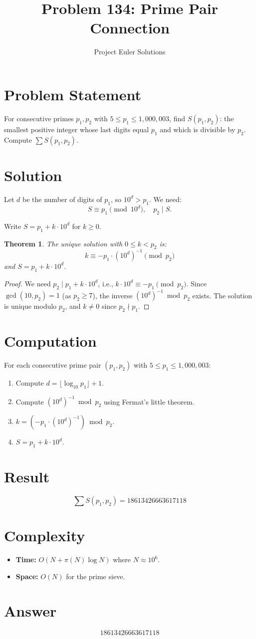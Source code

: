 \documentclass[12pt]{article}
\title{Problem 134: Prime Pair Connection}
\author{Project Euler Solutions}
\date{}
\newtheorem{theorem}{Theorem}
\begin{document}
\maketitle

\section{Problem Statement}
For consecutive primes $p_1, p_2$ with $5 \leq p_1 \leq 1{,}000{,}003$, find $S(p_1, p_2)$: the smallest positive integer whose last digits equal $p_1$ and which is divisible by $p_2$. Compute $\sum S(p_1, p_2)$.

\section{Solution}

Let $d$ be the number of digits of $p_1$, so $10^d > p_1$. We need:
\[
S \equiv p_1 \pmod{10^d}, \quad p_2 \mid S.
\]

Write $S = p_1 + k \cdot 10^d$ for $k \geq 0$.

\begin{theorem}
The unique solution with $0 \leq k < p_2$ is:
\[
k \equiv -p_1 \cdot (10^d)^{-1} \pmod{p_2}
\]
and $S = p_1 + k \cdot 10^d$.
\end{theorem}

\begin{proof}
We need $p_2 \mid p_1 + k \cdot 10^d$, i.e., $k \cdot 10^d \equiv -p_1 \pmod{p_2}$. Since $\gcd(10, p_2) = 1$ (as $p_2 \geq 7$), the inverse $(10^d)^{-1} \bmod p_2$ exists. The solution is unique modulo $p_2$, and $k \neq 0$ since $p_2 \nmid p_1$.
\end{proof}

\section{Computation}
For each consecutive prime pair $(p_1, p_2)$ with $5 \leq p_1 \leq 1{,}000{,}003$:
\begin{enumerate}
    \item Compute $d = \lfloor \log_{10} p_1 \rfloor + 1$.
    \item Compute $(10^d)^{-1} \bmod p_2$ using Fermat's little theorem.
    \item $k = (-p_1 \cdot (10^d)^{-1}) \bmod p_2$.
    \item $S = p_1 + k \cdot 10^d$.
\end{enumerate}

\section{Result}
\[
\sum S(p_1, p_2) = \boxed{18613426663617118}
\]

\section{Complexity}
\begin{itemize}
    \item \textbf{Time:} $O(N + \pi(N) \log N)$ where $N \approx 10^6$.
    \item \textbf{Space:} $O(N)$ for the prime sieve.
\end{itemize}

\section{Answer}

\[
\boxed{18613426663617118}
\]
\end{document}

